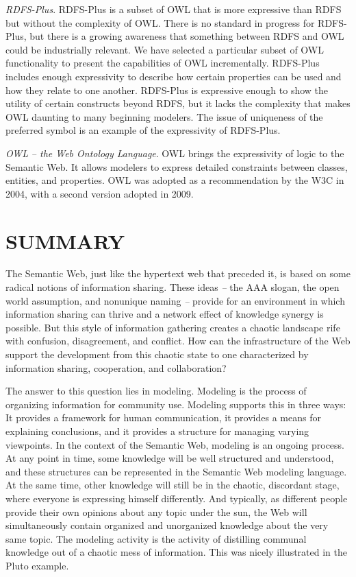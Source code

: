 \emph{RDFS-Plus}. RDFS-Plus is a subset of OWL that is more expressive
than RDFS but without the complexity of OWL. There is no standard in
progress for RDFS-Plus, but there is a growing awareness that something
between RDFS and OWL could be industrially relevant. We have selected a
particular subset of OWL functionality to present the capabilities of
OWL incrementally. RDFS-Plus includes enough expressivity to describe
how certain properties can be used and how they relate to one another.
RDFS-Plus is expressive enough to show the utility of certain constructs
beyond RDFS, but it lacks the complexity that makes OWL daunting to many
beginning modelers. The issue of uniqueness of the preferred symbol is
an example of the expressivity of RDFS-Plus.

\emph{OWL} \emph{-- the Web Ontology Language}. OWL brings the
expressivity of logic to the Semantic Web. It allows modelers to express
detailed constraints between classes, entities, and properties. OWL was
adopted as a recommendation by the W3C in 2004, with a second version
adopted in 2009.

\section{SUMMARY}

The Semantic Web, just like the hypertext web that preceded it, is based
on some radical notions of information sharing. These ideas \emph{--}
the AAA slogan, the open world assumption, and nonunique naming
\emph{--} provide for an environment in which information sharing can
thrive and a network effect of knowledge synergy is possible. But this
style of information gathering creates a chaotic landscape rife with
confusion, disagreement, and conflict. How can the infrastructure of the
Web support the development from this chaotic state to one characterized
by information sharing, cooperation, and collaboration?

The answer to this question lies in modeling. Modeling is the process of
organizing information for community use. Modeling supports this in
three ways: It provides a framework for human communication, it provides
a means for explaining conclusions, and it provides a structure for
managing varying viewpoints. In the context of the Semantic Web,
modeling is an ongoing process. At any point in time, some knowledge
will be well structured and understood, and these structures can be
represented in the Semantic Web modeling language. At the same time,
other knowledge will still be in the chaotic, discordant stage, where
everyone is expressing himself differently. And typically, as different
people provide their own opinions about any topic under the sun, the Web
will simultaneously contain organized and unorganized knowledge about
the very same topic. The modeling activity is the activity of distilling
communal knowledge out of a chaotic mess of information. This was nicely
illustrated in the Pluto example.

